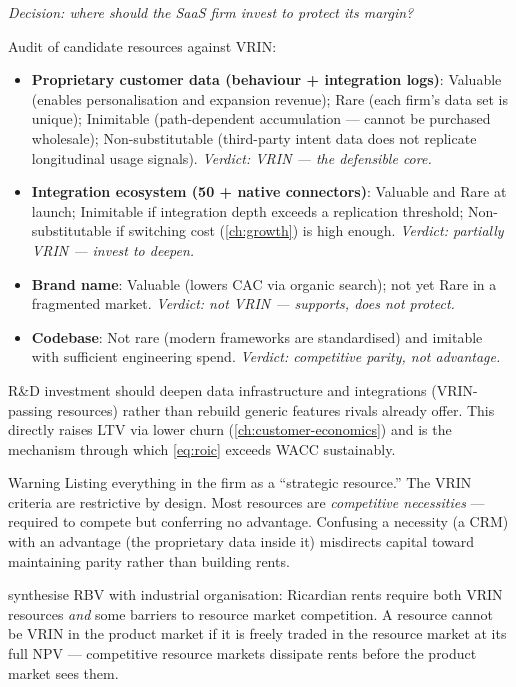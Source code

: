 \begin{example}
\emph{Decision: where should the SaaS firm invest to protect its margin?}

Audit of candidate resources against VRIN:

\begin{itemize}
  \item \textbf{Proprietary customer data (behaviour + integration logs)}: Valuable
        (enables personalisation and expansion revenue); Rare (each firm's data set is
        unique); Inimitable (path-dependent accumulation --- cannot be purchased wholesale);
        Non-substitutable (third-party intent data does not replicate longitudinal usage
        signals). \emph{Verdict: VRIN --- the defensible core.}
  \item \textbf{Integration ecosystem (50 + native connectors)}: Valuable and Rare at launch;
        Inimitable if integration depth exceeds a replication threshold; Non-substitutable
        if switching cost (\cref{ch:growth}) is high enough. \emph{Verdict: partially VRIN
        --- invest to deepen.}
  \item \textbf{Brand name}: Valuable (lowers CAC via organic search); not yet Rare in a
        fragmented market. \emph{Verdict: not VRIN --- supports, does not protect.}
  \item \textbf{Codebase}: Not rare (modern frameworks are standardised) and imitable with
        sufficient engineering spend. \emph{Verdict: competitive parity, not advantage.}
\end{itemize}

R\&D investment should deepen data infrastructure and integrations
(VRIN-passing resources) rather than rebuild generic features rivals already offer.
This directly raises LTV via lower churn (\cref{ch:customer-economics}) and is
the mechanism through which \cref{eq:roic} exceeds WACC sustainably.
\end{example}

\begin{admonition}{Warning}
Listing everything in the firm as a ``strategic resource.'' The VRIN criteria are
restrictive by design. Most resources are \emph{competitive necessities} --- required to
compete but conferring no advantage. Confusing a necessity (a CRM) with an advantage (the
proprietary data inside it) misdirects capital toward maintaining parity rather than
building rents.
\end{admonition}

\textcite{dranove7theconomics} synthesise RBV with industrial organisation: Ricardian rents
require both VRIN resources \emph{and} some barriers to resource market competition.
A resource cannot be VRIN in the product market if it is freely traded in the resource
market at its full NPV --- competitive resource markets dissipate rents before the product
market sees them.

